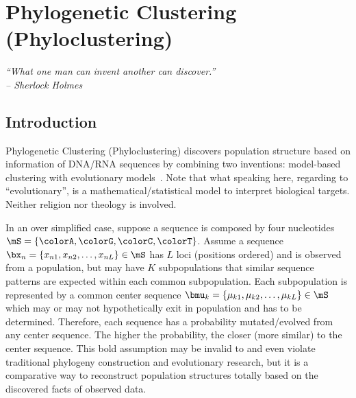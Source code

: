 
\chapter{Phylogenetic Clustering (Phyloclustering)}
\label{chp:phyloclustering}


{\it
``What one man can invent another can discover.''\\
\--- Sherlock Holmes
}


\section{Introduction}

Phylogenetic Clustering (Phyloclustering)
discovers population structure based on information of DNA/RNA sequences
by combining two inventions: model-based clustering with evolutionary
models~\citep{Chen2011a}.
Note that what speaking here, regarding to ``evolutionary'',
is a mathematical/statistical model to interpret biological targets.
Neither religion nor theology is involved. 

In an over simplified case, suppose a sequence is composed by four nucleotides
$\mS = \{\colorA, \colorG, \colorC, \colorT\}$.
Assume a sequence
$\bx_n = \{x_{n1}, x_{n2},\ldots, x_{nL}\} \in \mS$
has $L$ loci (positions ordered) and is observed from a population, but
may have $K$ subpopulations that similar sequence patterns are expected
within each common subpopulation.
Each subpopulation is represented by a common center sequence
$\bmu_k = \{\mu_{k1}, \mu_{k2},\ldots, \mu_{kL}\} \in \mS$
which may or may not hypothetically exit in population and has to be
determined.
Therefore, each sequence has a probability mutated/evolved from any
center sequence. The higher the probability, the closer (more similar)
to the center sequence. This bold assumption may be invalid to and even violate
traditional phylogeny construction and evolutionary research, but it is
a comparative way to reconstruct population structures totally
based on the discovered facts of observed data.

